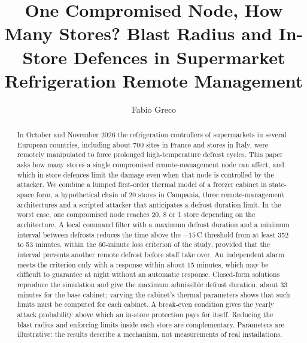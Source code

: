 \documentclass{ceurart}
\newcommand{\degC}{\,\textdegree{}C}
\begin{document}


\title{One Compromised Node, How Many Stores? Blast Radius and In-Store Defences in Supermarket Refrigeration Remote Management}

\author[1]{Fabio Greco}
\fnmark[1]
\address[1]{Independent researcher, Naples, Italy}

\begin{abstract}
In October and November 2026 the refrigeration controllers of supermarkets in several European countries, including about 700 sites in France and stores in Italy, were remotely manipulated to force prolonged high-temperature defrost cycles.
This paper asks how many stores a single compromised remote-management node can affect, and which in-store defences limit the damage even when that node is controlled by the attacker.
We combine a lumped first-order thermal model of a freezer cabinet in state-space form, a hypothetical chain of 20 stores in Campania, three remote-management architectures and a scripted attacker that anticipates a defrost duration limit.
In the worst case, one compromised node reaches 20, 8 or 1 store depending on the architecture.
A local command filter with a maximum defrost duration and a minimum interval between defrosts reduces the time above the $-15$\degC{} threshold from at least 352 to 53 minutes, within the 60-minute loss criterion of the study, provided that the interval prevents another remote defrost before staff take over.
An independent alarm meets the criterion only with a response within about 15 minutes, which may be difficult to guarantee at night without an automatic response.
Closed-form solutions reproduce the simulation and give the maximum admissible defrost duration, about 33 minutes for the base cabinet; varying the cabinet's thermal parameters shows that such limits must be computed for each cabinet.
A break-even condition gives the yearly attack probability above which an in-store protection pays for itself.
Reducing the blast radius and enforcing limits inside each store are complementary.
Parameters are illustrative: the results describe a mechanism, not measurements of real installations.
\end{abstract}
\end{document}
